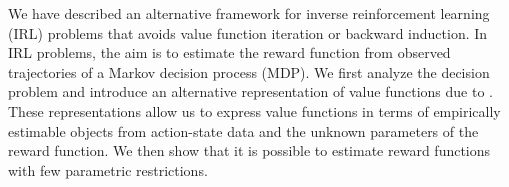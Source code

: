 \documentclass{article}
\renewcommand{\vec}[1]{\mbox{\bm{$#1$}}}
\begin{document}

We have described an alternative framework for inverse reinforcement learning (IRL) problems that avoids value function iteration or backward induction. In IRL problems, the aim is to estimate the reward function from observed trajectories of a Markov decision process (MDP). We first analyze the decision problem and introduce an alternative representation of value functions due to \cite{hotz}. These representations allow us to express value functions in terms of empirically estimable objects from action-state data and the unknown parameters of the reward function. We then show that it is possible to estimate reward functions with few parametric restrictions. 









\end{document}
